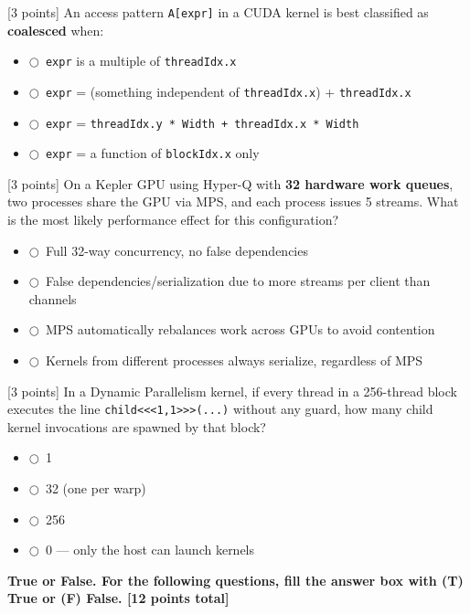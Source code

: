 \documentclass[12pt]{exam}
\newcommand{\mc}{$\bigcirc$\ }
\begin{document}
\begin{questions}
\question {}[3 points] An access pattern \texttt{A[expr]} in a CUDA kernel is best classified as
\textbf{coalesced} when:
\begin{itemize}[leftmargin=2.5em,itemsep=4pt,label={}]
  \item \mc \texttt{expr} is a multiple of \texttt{threadIdx.x}
  \item \mc \texttt{expr} = (something independent of \texttt{threadIdx.x}) + \texttt{threadIdx.x}
  \item \mc \texttt{expr} = \texttt{threadIdx.y * Width + threadIdx.x * Width}
  \item \mc \texttt{expr} = a function of \texttt{blockIdx.x} only
\end{itemize}

\question {}[3 points] On a Kepler GPU using Hyper-Q with \textbf{32 hardware work queues}, two
processes share the GPU via MPS, and each process issues 5 streams. What is the most likely
performance effect for this configuration?
\begin{itemize}[leftmargin=2.5em,itemsep=4pt,label={}]
  \item \mc Full 32-way concurrency, no false dependencies
  \item \mc False dependencies/serialization due to more streams per client than channels
  \item \mc MPS automatically rebalances work across GPUs to avoid contention
  \item \mc Kernels from different processes always serialize, regardless of MPS
\end{itemize}

\question {}[3 points] In a Dynamic Parallelism kernel, if every thread in a 256-thread block
executes the line \texttt{child<<<1,1>>>(...)} without any guard, how many child kernel
invocations are spawned by that block?
\begin{itemize}[leftmargin=2.5em,itemsep=4pt,label={}]
  \item \mc 1
  \item \mc 32 (one per warp)
  \item \mc 256
  \item \mc 0 — only the host can launch kernels
\end{itemize}

\newpage
\textbf{True or False. \textnormal{For the following questions, fill the answer box with (T)
True or (F) False.} [12 points total]}


\end{questions}
\end{document}
